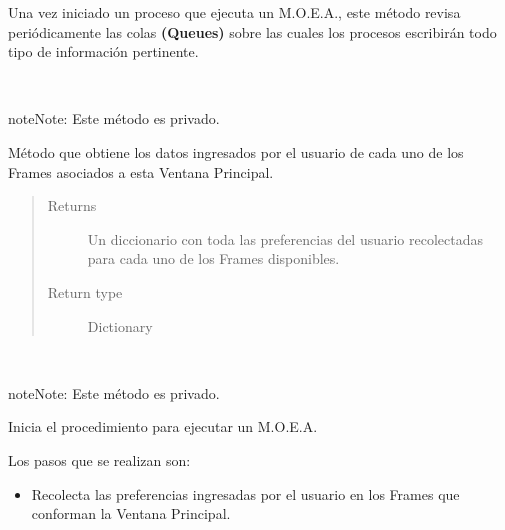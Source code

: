 \documentclass[letterpaper,10pt,english]{sphinxmanual}
\begin{document}
\begin{fulllineitems}
\begin{fulllineitems}
Una vez iniciado un proceso que ejecuta un M.O.E.A., este método
revisa periódicamente las colas \textbf{(Queues)} sobre las cuales los procesos
escribirán todo tipo de información pertinente.

\end{fulllineitems}


\begin{fulllineitems}
\label{View/MainWindow:View.MainWindow.MainWindow._MainWindow__get_information}~
\begin{notice}{note}{Note:}
Este método es privado.
\end{notice}

Método que obtiene los datos ingresados por el usuario
de cada uno de los Frames asociados a esta Ventana Principal.
\begin{quote}\begin{description}
\item[{Returns}] \leavevmode
Un diccionario con toda las preferencias del usuario recolectadas
para cada uno de los Frames disponibles.

\item[{Return type}] \leavevmode
Dictionary

\end{description}\end{quote}

\end{fulllineitems}


\begin{fulllineitems}
\label{View/MainWindow:View.MainWindow.MainWindow._MainWindow__init_procedure}~
\begin{notice}{note}{Note:}
Este método es privado.
\end{notice}

\begin{DUlineblock}{0em}
\item[] Inicia el procedimiento para ejecutar un M.O.E.A.
\item[] Los pasos que se realizan son:
\end{DUlineblock}
\begin{itemize}
\item {} 
Recolecta las preferencias ingresadas por el usuario en los Frames que conforman la Ventana Principal.


\end{itemize}
\end{fulllineitems}
\end{fulllineitems}
\end{document}
